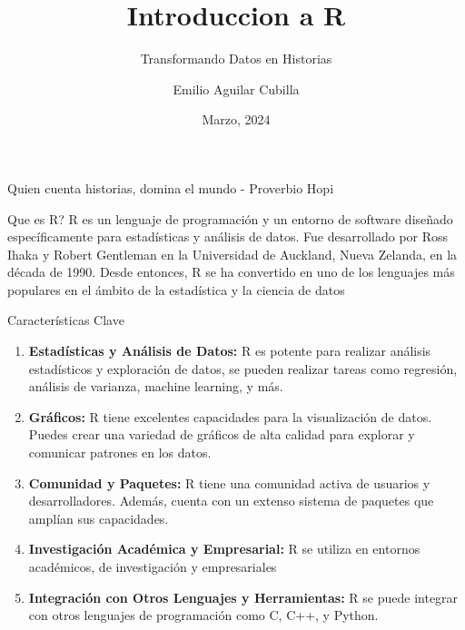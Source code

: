 \documentclass[
  ignorenonframetext,
]{beamer}
\title{Introduccion a R}
\subtitle{Transformando Datos en Historias}
\author{Emilio Aguilar Cubilla}
\date{Marzo, 2024}
\begin{document}
\frame{\titlepage}

\begin{frame}{Quien cuenta historias, domina el mundo - Proverbio Hopi}
\protect\hypertarget{quien-cuenta-historias-domina-el-mundo---proverbio-hopi}{}
\end{frame}

\begin{frame}{Que es R?}
\protect\hypertarget{que-es-r}{}
R es un lenguaje de programación y un entorno de software diseñado
específicamente para estadísticas y análisis de datos. Fue desarrollado
por Ross Ihaka y Robert Gentleman en la Universidad de Auckland, Nueva
Zelanda, en la década de 1990. Desde entonces, R se ha convertido en uno
de los lenguajes más populares en el ámbito de la estadística y la
ciencia de datos

\begin{block}{Características Clave}
\protect\hypertarget{caracteruxedsticas-clave}{}
\begin{enumerate}
\item
  \textbf{Estadísticas y Análisis de Datos:} R es potente para realizar
  análisis estadísticos y exploración de datos, se pueden realizar
  tareas como regresión, análisis de varianza, machine learning, y más.
\item
  \textbf{Gráficos:} R tiene excelentes capacidades para la
  visualización de datos. Puedes crear una variedad de gráficos de alta
  calidad para explorar y comunicar patrones en los datos.
\item
  \textbf{Comunidad y Paquetes:} R tiene una comunidad activa de
  usuarios y desarrolladores. Además, cuenta con un extenso sistema de
  paquetes que amplían sus capacidades.
\item
  \textbf{Investigación Académica y Empresarial:} R se utiliza en
  entornos académicos, de investigación y empresariales
\item
  \textbf{Integración con Otros Lenguajes y Herramientas:} R se puede
  integrar con otros lenguajes de programación como C, C++, y Python.
\end{enumerate}
\end{block}
\end{frame}
\end{document}
